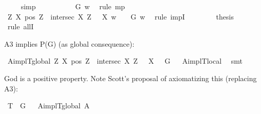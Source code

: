 \begin{isabellebody}
\ {}\ {}\ \isamarkupfalse%
\ simp\isanewline
\ \ \ \ \isamarkupfalse%
\ {}\ {}\ \isamarkupfalse%
\ {\isachardoublequoteopen}{\isasymP}\ G\ w{\isachardoublequoteclose}\ \isamarkupfalse%
\ {\isacharparenleft}rule\ mp{\isacharparenright}\isanewline
\ \ \isacommand{{\isacharbraceright}}\isamarkupfalse%
\isanewline
\ \ \isamarkupfalse%
\ {\isachardoublequoteopen}{\isacharparenleft}\isactrlbold {\isasymforall}Z\ X{\isachardot}\ {\isacharparenleft}pos\ Z\ \isactrlbold {\isasymand}\ intersec\ X\ Z{\isacharparenright}\ \isactrlbold {\isasymrightarrow}\ {\isasymP}\ X{\isacharparenright}\ w\ \ {\isasymlongrightarrow}\ {\isasymP}\ G\ w{\isachardoublequoteclose}\ \isamarkupfalse%
\ {\isacharparenleft}rule\ impI{\isacharparenright}\isanewline
\ \ \isacommand{{\isacharbraceright}}\isamarkupfalse%
\ \isanewline
\ \ \isamarkupfalse%
\ {\isacharquery}thesis\ \isamarkupfalse%
\ {\isacharparenleft}rule\ allI{\isacharparenright}\isanewline
{}\isamarkupfalse%
%
\endisatagproof
{\isafoldproof}%
%
\isadelimproof
%
\endisadelimproof
%
\begin{isamarkuptext}%
A3 implies P(G) (as global consequence):%
\end{isamarkuptext}\isamarkuptrue%
\isamarkupfalse%
\ A{}implT{}{\isacharunderscore}global{\isacharcolon}\ {\isachardoublequoteopen}{\isasymlfloor}\isactrlbold {\isasymforall}Z\ X{\isachardot}\ {\isacharparenleft}pos\ Z\ \isactrlbold {\isasymand}\ intersec\ X\ Z{\isacharparenright}\ \isactrlbold {\isasymrightarrow}\ {\isasymP}\ X{\isasymrfloor}\ {\isasymlongrightarrow}\ {\isasymlfloor}{\isasymP}\ G{\isasymrfloor}{\isachardoublequoteclose}%
\isadelimproof
\ %
\endisadelimproof
%
\isatagproof
{}\isamarkupfalse%
\ A{}implT{}{\isacharunderscore}local\ \isamarkupfalse%
\ smt%
\endisatagproof
{\isafoldproof}%
%
\isadelimproof
%
\endisadelimproof
%
\begin{isamarkuptext}%
God is a positive property. Note Scott's proposal of axiomatizing this (replacing A3):%
\end{isamarkuptext}\isamarkuptrue%
\isamarkupfalse%
\ T{}{\isacharcolon}\ {\isachardoublequoteopen}{\isasymlfloor}{\isasymP}\ G{\isasymrfloor}{\isachardoublequoteclose}%
\isadelimproof
\ %
\endisadelimproof
%
\isatagproof
{}\isamarkupfalse%
\ A{}implT{}{\isacharunderscore}global\ A{}\ \isamarkupfalse%

\end{isabellebody}
